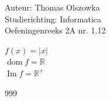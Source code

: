 \documentclass[a4paper]{article}
\begin{document}
\noindent \large Auteur: Thomas Olszowka \\
\noindent \large Studierichting: Informatica\\
\noindent \large Oefeningenreeks 2A nr. 1.12\\

\medskip

\normalsize

$f(x) = |x|$ \\

$\operatorname{dom}f = \mathbb{R}$ \\

$\operatorname{Im}f = \mathbb{R}^{+}$ \\

\begin{thebibliography}{999}
\end{thebibliography}
\end{document}
